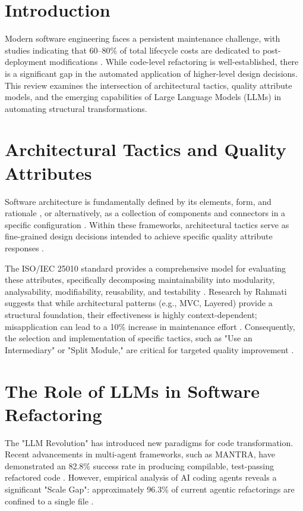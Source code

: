 \documentclass[sigconf,review]{acmart}
\begin{document}
\maketitle

\section{Introduction}
Modern software engineering faces a persistent maintenance challenge, with studies indicating that 60--80\% of total lifecycle costs are dedicated to post-deployment modifications \cite{bass2021software}. While code-level refactoring is well-established, there is a significant gap in the automated application of higher-level design decisions. This review examines the intersection of architectural tactics, quality attribute models, and the emerging capabilities of Large Language Models (LLMs) in automating structural transformations.

\section{Architectural Tactics and Quality Attributes}
Software architecture is fundamentally defined by its elements, form, and rationale \cite{perry1992foundations}, or alternatively, as a collection of components and connectors in a specific configuration \cite{garlan1993introduction}. Within these frameworks, architectural tactics serve as fine-grained design decisions intended to achieve specific quality attribute responses \cite{bass2021software}.

The ISO/IEC 25010 standard provides a comprehensive model for evaluating these attributes, specifically decomposing maintainability into modularity, analysability, modifiability, reusability, and testability \cite{bass2021software}. Research by Rahmati suggests that while architectural patterns (e.g., MVC, Layered) provide a structural foundation, their effectiveness is highly context-dependent; misapplication can lead to a 10\% increase in maintenance effort \cite{rahmati2021ensuring}. Consequently, the selection and implementation of specific tactics, such as "Use an Intermediary" or "Split Module," are critical for targeted quality improvement \cite{bass2021software}.

\section{The Role of LLMs in Software Refactoring}
The "LLM Revolution" has introduced new paradigms for code transformation. Recent advancements in multi-agent frameworks, such as MANTRA, have demonstrated an 82.8\% success rate in producing compilable, test-passing refactored code \cite{xu2025mantra}. However, empirical analysis of AI coding agents reveals a significant "Scale Gap": approximately 96.3\% of current agentic refactorings are confined to a single file \cite{horikawa2025agentic}.
\end{document}
